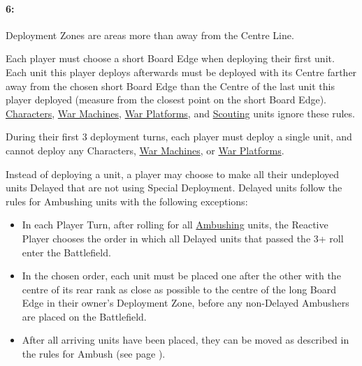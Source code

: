\begin{minipage}{0.67\textwidth}
\idx[main=y]{\marchingcolumns}\hypertarget{marching_columns}{\paragraph{6\spacebeforecolon{}: \marchingcolumns}}
\vspace*{0.5ex}

Deployment Zones are areas more than  away from the Centre Line.

Each player must choose a short Board Edge when deploying their first unit. Each unit this player deploys afterwards must be deployed with its Centre farther away from the chosen short Board Edge than the Centre of the last unit this player deployed (measure from the closest point on the short Board Edge). \hyperref[characters]{Characters}, \hyperref[war_machine]{War Machines}, \hyperref[war_platform]{War Platforms}, and \hyperref[scout]{Scouting} units ignore these rules.

During their first 3 deployment turns, each player must deploy a single unit, and cannot deploy any Characters, \hyperref[war_machine]{War Machines}, or \hyperref[war_platform]{War Platforms}.

Instead of deploying a unit, a player may choose to make all their undeployed units Delayed that are not using Special Deployment. Delayed units follow the rules for Ambushing units with the following exceptions:
\begin{itemize}
\item In each Player Turn, after rolling for all \hyperref[ambush]{Ambushing} units, the Reactive Player chooses the order in which all Delayed units that passed the 3+ roll enter the Battlefield.
\item In the chosen order, each unit must be placed one after the other with the centre of its rear rank as close as possible to the centre of the long Board Edge in their owner's Deployment Zone, before any non-Delayed Ambushers are placed on the Battlefield.
\item After all arriving units have been placed, they can be moved as described in the rules for Ambush (see page \pageref{ambush}).
\end{itemize}
\end{minipage}\hfill\begin{minipage}{0.275\textwidth}
\def\MarchColfontsize{\fontsize{5.5}{7}\selectfont}
\def\svgwidth{\textwidth}

\end{minipage}\hspace*{0.022\textwidth}

